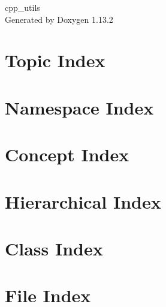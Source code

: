 \documentclass[twoside]{book}
\newcommand{\+}{\discretionary{\mbox{\scriptsize$\hookleftarrow$}}{}{}}
\newcommand{\clearemptydoublepage}{%
    \newpage{\pagestyle{empty}\cleardoublepage}%
  }
\begin{document}
  \raggedbottom
    \hypersetup{pageanchor=false,
                bookmarksnumbered=true,
                pdfencoding=unicode
               }
  \begin{titlepage}
  \vspace*{7cm}
  \begin{center}%
  {\Large cpp\+\_\+utils}\\
  \vspace*{1cm}
  {\large Generated by Doxygen 1.13.2}\\
  \end{center}
  \end{titlepage}
  \clearemptydoublepage
  \tableofcontents
  \clearemptydoublepage
  \hypersetup{pageanchor=true}


\chapter{Topic Index}

\chapter{Namespace Index}

\chapter{Concept Index}

\chapter{Hierarchical Index}

\chapter{Class Index}

\chapter{File Index}

\end{document}
